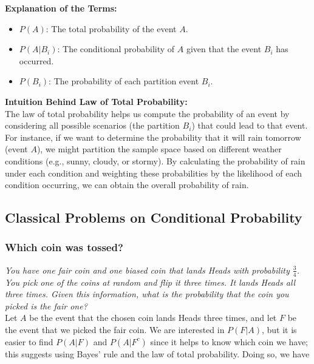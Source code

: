 \textbf{Explanation of the Terms:}

\begin{itemize}
    \item \( P(A) \): The total probability of the event \( A \).
    \item \( P(A|B_i) \): The conditional probability of \( A \) given that the event \( B_i \) has occurred.
    \item  \( P(B_i) \): The probability of each partition event \( B_i \).
\end{itemize}

\textbf{Intuition Behind Law of Total Probability:}\\

The law of total probability helps us compute the probability of an event by considering all possible scenarios (the partition \( B_i \)) that could lead to that event. For instance, if we want to determine the probability that it will rain tomorrow (event \( A \)), we might partition the sample space based on different weather conditions (e.g., sunny, cloudy, or stormy). By calculating the probability of rain under each condition and weighting these probabilities by the likelihood of each condition occurring, we can obtain the overall probability of rain.

\subsection{Classical Problems on Conditional Probability}

\subsubsection{Which coin was tossed?}

\textit{You have one fair coin and one biased coin that lands Heads with probability \( \frac{3}{4} \). You pick one of the coins at random and flip it three times. It lands Heads all three times. Given this information, what is the probability that the coin you picked is the fair one?}\\

Let \( A \) be the event that the chosen coin lands Heads three times, and let \( F \) be the event that we picked the fair coin. We are interested in \( P(F | A) \), but it is easier to find \( P(A | F) \) and \( P(A | F^c) \) since it helps to know which coin we have; this suggests using Bayes’ rule and the law of total probability. Doing so, we have

